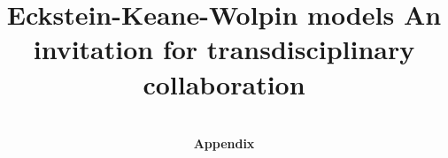 
\title{Eckstein-Keane-Wolpin models An invitation for transdisciplinary collaboration}
\author{\\\Huge{\textbf{Appendix}}}
\date{}
